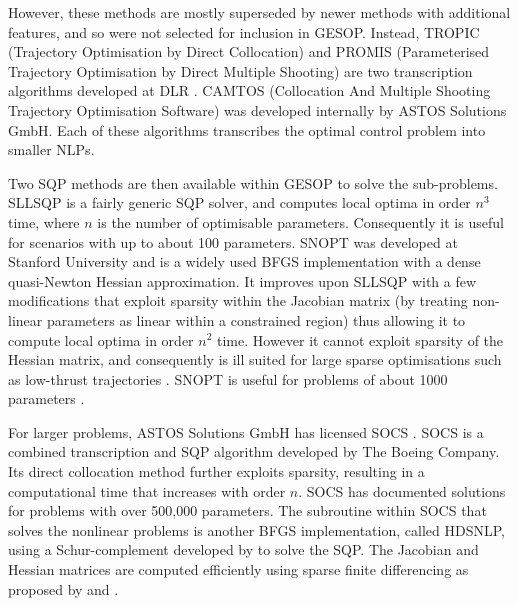 However, these methods are mostly superseded by newer methods with additional features, and so were not selected for inclusion in GESOP. Instead, TROPIC (Trajectory Optimisation by Direct Collocation) and PROMIS (Parameterised Trajectory Optimisation by Direct Multiple Shooting) are two transcription algorithms developed at DLR \parencite{Jansch1990}. %
CAMTOS (Collocation And Multiple Shooting Trajectory Optimisation Software) was developed internally by ASTOS Solutions GmbH. Each of these algorithms transcribes the optimal control problem into smaller NLPs. 

Two SQP methods are then available within GESOP to solve the sub-problems. SLLSQP is a fairly generic SQP solver, and computes local optima in order $n^{3}$ time, where $n$ is the number of optimisable parameters. Consequently it is useful for scenarios with up to about 100 parameters. SNOPT \parencite[Sparse Nonlinear Optimizer, ][]{Gill1997} was developed at Stanford University and is a widely used BFGS implementation with a dense quasi-Newton Hessian approximation. It improves upon SLLSQP with a few modifications that exploit sparsity within the Jacobian matrix (by treating non-linear parameters as linear within a constrained region) thus allowing it to compute local optima in order $n^{2}$ time. However it cannot exploit sparsity of the Hessian matrix, and consequently is ill suited for large sparse optimisations such as low-thrust trajectories \parencite{Betts2002}. SNOPT is useful for problems of about 1000 parameters \parencite{ASTOS_guide}.

For larger problems, ASTOS Solutions GmbH has licensed SOCS \parencite[Sparse Optimal Control Software, ][]{SOCS_guide}. SOCS is a combined transcription and SQP algorithm developed by The Boeing Company. Its direct collocation method further exploits sparsity, resulting in a computational time that increases with order $n$. SOCS has documented solutions for problems with over 500,000 parameters. The subroutine within SOCS that solves the nonlinear problems is another BFGS implementation, called HDSNLP, using a Schur-complement developed by \textcite{Gill1987} to solve the SQP. The Jacobian and Hessian matrices are computed efficiently using sparse finite differencing as proposed by \textcite{Coleman1983} and \textcite{Curtis1974}.

